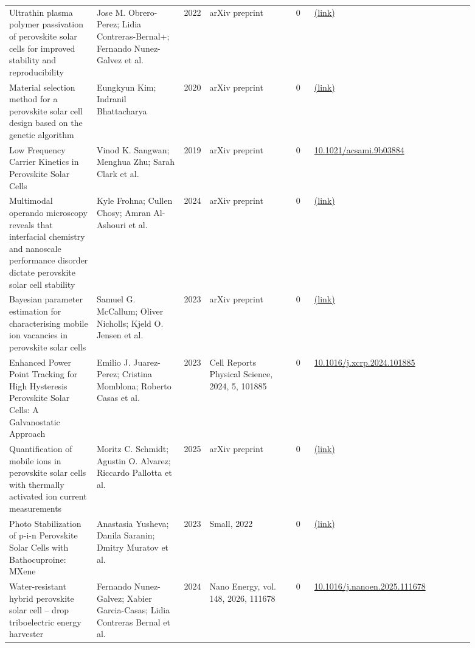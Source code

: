\documentclass[10pt,a4paper]{article}
\begin{document}
{\begin{longtable}{p{0.197\linewidth}p{0.197\linewidth}p{0.043\linewidth}p{0.197\linewidth}p{0.043\linewidth}p{0.117\linewidth}p{0.098\linewidth}}
Ultrathin plasma polymer passivation of perovskite solar cells for improved stability and reproducibility & Jose M. Obrero-Perez; Lidia Contreras-Bernal+; Fernando Nunez-Galvez et al. & 2022 & arXiv preprint & 0 & \href{http://arxiv.org/abs/2202.08188v1}{(link)} &  \\
Material selection method for a perovskite solar cell design based on the genetic algorithm & Eungkyun Kim; Indranil Bhattacharya & 2020 & arXiv preprint & 0 & \href{http://arxiv.org/abs/2011.07651v1}{(link)} &  \\
Low Frequency Carrier Kinetics in Perovskite Solar Cells & Vinod K. Sangwan; Menghua Zhu; Sarah Clark et al. & 2019 & arXiv preprint & 0 & \href{https://doi.org/10.1021/acsami.9b03884}{10.1021/acsami.9b03884} &  \\
Multimodal operando microscopy reveals that interfacial chemistry and nanoscale performance disorder dictate perovskite solar cell stability & Kyle Frohna; Cullen Chosy; Amran Al-Ashouri et al. & 2024 & arXiv preprint & 0 & \href{http://arxiv.org/abs/2403.16988v1}{(link)} &  \\
Bayesian parameter estimation for characterising mobile ion vacancies in perovskite solar cells & Samuel G. McCallum; Oliver Nicholls; Kjeld O. Jensen et al. & 2023 & arXiv preprint & 0 & \href{http://arxiv.org/abs/2309.14302v1}{(link)} &  \\
Enhanced Power Point Tracking for High Hysteresis Perovskite Solar Cells: A Galvanostatic Approach & Emilio J. Juarez-Perez; Cristina Momblona; Roberto Casas et al. & 2023 & Cell Reports Physical Science, 2024, 5, 101885 & 0 & \href{https://doi.org/10.1016/j.xcrp.2024.101885}{10.1016/j.xcrp.2024.101885} &  \\
Quantification of mobile ions in perovskite solar cells with thermally activated ion current measurements & Moritz C. Schmidt; Agustin O. Alvarez; Riccardo Pallotta et al. & 2025 & arXiv preprint & 0 & \href{http://arxiv.org/abs/2508.19403v1}{(link)} &  \\
Photo Stabilization of p-i-n Perovskite Solar Cells with Bathocuproine: MXene & Anastasia Yusheva; Danila Saranin; Dmitry Muratov et al. & 2023 & Small, 2022 & 0 & \href{http://arxiv.org/abs/2311.09695v1}{(link)} &  \\
Water-resistant hybrid perovskite solar cell -- drop triboelectric energy harvester & Fernando Nunez-Galvez; Xabier Garcia-Casas; Lidia Contreras Bernal et al. & 2024 & Nano Energy, vol. 148, 2026, 111678 & 0 & \href{https://doi.org/10.1016/j.nanoen.2025.111678}{10.1016/j.nanoen.2025.111678} &  \\

\end{longtable}}
\end{document}
